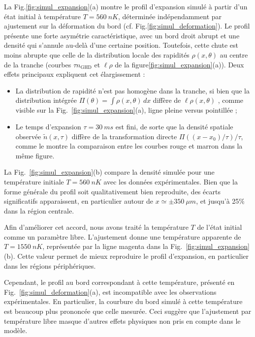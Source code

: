 \medskip

La Fig.\ref{fig:simul_expansion}(a) montre le profil d’expansion simulé à partir d’un état initial à température $T = 560~nK$, déterminée indépendamment par ajustement sur la déformation du bord (cf. Fig.\ref{fig:simul_deformation}). Le profil présente une forte asymétrie caractéristique, avec un bord droit abrupt et une densité qui s'annule au-delà d’une certaine position. Toutefois, cette chute est moins abrupte que celle de la distribution locale des rapidités $\rho(x, \theta)$ au centre de la tranche (courbes $\tau n_{\mathrm{GHD}}$ et $\ell \rho$ de la figure\ref{fig:simul_expansion}(a)). Deux effets principaux expliquent cet élargissement :
\begin{itemize}
	\item[(i)] La distribution de rapidité n’est pas homogène dans la tranche, si bien que la distribution intégrée $\Pi(\theta) = \int \rho(x,\theta) \, dx $  diffère de $\ell \rho(x , \theta )$ , comme visible sur la Fig.~\ref{fig:simul_expansion}(a), ligne pleine versus pointillée ;
	\item[(ii)] Le temps d’expansion $\tau =30~ ms$ est fini, de sorte que la densité spatiale observée $\tilde{n}(x , \tau )$ diffère de la transformation directe $\Pi( (x-x_0)/\tau) /\tau $, comme le montre la comparaison entre les courbes rouge et marron dans la même figure.
\end{itemize}

\medskip

La Fig.~\ref{fig:simul_expansion}(b) compare la densité simulée pour une température initiale  $T=560~nK$ avec les données expérimentales. Bien que la forme générale du profil soit qualitativement bien reproduite, des écarts significatifs apparaissent, en particulier autour de $x \simeq \pm 350 ~\mu m$, et jusqu’à 25$\%$ dans la région centrale.

\medskip

Afin d’améliorer cet accord, nous avons traité la température $T$ de l’état initial comme un paramètre libre. L’ajustement donne une température apparente de $T=1550~nK$, représentée par la ligne magenta dans la Fig.~\ref{fig:simul_expansion}(b). Cette valeur permet de mieux reproduire le profil d’expansion, en particulier dans les régions périphériques.

\medskip

Cependant, le profil au bord correspondant à cette température, présenté en Fig.~\ref{fig:simul_deformation}(a), est incompatible avec les observations expérimentales. En particulier, la courbure du bord simulé à cette température est beaucoup plus prononcée que celle mesurée. Ceci suggère que l’ajustement par température libre masque d'autres effets physiques non pris en compte dans le modèle.

